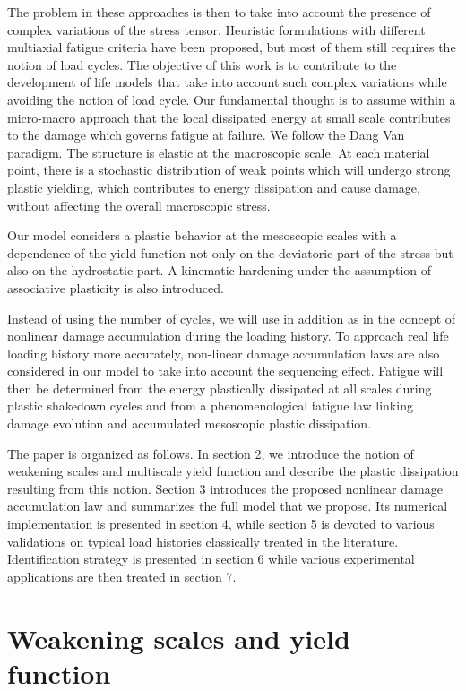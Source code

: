 \documentclass[3p,times,number,review]{elsarticle}
\begin{document}
The problem in these approaches is then to take into account the presence of complex variations of the stress tensor. Heuristic formulations with different multiaxial fatigue criteria have been proposed, but most of them still requires the notion of load cycles. The objective of this work is to contribute to the development of life models that take into account such complex variations while avoiding the notion of load cycle. Our fundamental thought is to assume within a micro-macro approach that the local dissipated energy at small scale contributes to the damage which governs fatigue at failure. We follow the Dang Van paradigm. The structure is elastic  at the macroscopic scale. At each material point, there is a stochastic distribution of weak points which will undergo strong plastic yielding, which contributes to energy dissipation and cause damage, without affecting the overall macroscopic stress.

Our model considers a plastic behavior at the mesoscopic scales  with a dependence of the yield function not only on the deviatoric part of the stress but also on the hydrostatic part. A kinematic hardening under the assumption of associative plasticity is also introduced.

Instead of using the number of cycles, we will use in addition as in \cite{lemaitre1999two} the concept of nonlinear damage accumulation during the loading history. To approach real life loading history more accurately, non-linear damage accumulation laws are also considered in our model to take into account the sequencing effect. Fatigue will then be determined from the energy plastically dissipated at all scales during plastic shakedown cycles and from a phenomenological fatigue law linking damage evolution and accumulated mesoscopic plastic dissipation.

The paper is organized as follows. In section 2, we introduce the notion of weakening scales and multiscale yield function and describe the plastic dissipation resulting from this notion. Section 3 introduces the proposed nonlinear damage accumulation law and summarizes the full model that we propose. Its numerical implementation is presented in section 4, while section 5 is devoted to various validations on typical load histories classically treated in the literature. Identification strategy is presented in section 6 while various experimental applications are then treated in section 7.

\section{Weakening scales and yield function}
\label{sec:5.4}
\end{document}
